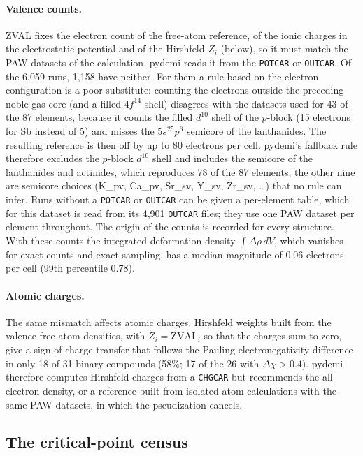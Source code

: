 \documentclass[11pt,a4paper]{article}
\begin{document}
\paragraph{Valence counts.} ZVAL fixes the electron count of the free-atom
reference, of the ionic charges in the electrostatic potential and of the
Hirshfeld $Z_i$ (below), so it must match the PAW datasets of the calculation.
pydemi reads it from the \texttt{POTCAR} or \texttt{OUTCAR}. Of the 6,059 runs,
1,158 have neither. For them a rule based on the electron configuration is a
poor substitute: counting the electrons outside the preceding noble-gas core
(and a filled $4f^{14}$ shell)
disagrees with the datasets used for 43 of the 87 elements, because it counts
the filled $d^{10}$ shell of the $p$-block (15 electrons for Sb instead of 5)
and misses the $5s^25p^6$ semicore of the lanthanides. The resulting reference
is then off by up to 80 electrons per cell. pydemi's fallback rule therefore
excludes the $p$-block $d^{10}$ shell and includes the semicore of the
lanthanides and actinides, which reproduces 78 of the 87 elements; the other
nine are semicore choices (K\_pv, Ca\_pv, Sr\_sv, Y\_sv, Zr\_sv, \ldots) that
no rule can infer. Runs without a \texttt{POTCAR} or \texttt{OUTCAR} can be
given a per-element table, which for this dataset is read from its 4,901
\texttt{OUTCAR} files; they use one PAW dataset per element throughout. The
origin of the counts is recorded for every structure. With these counts the
integrated deformation density $\int\Delta\rho\,dV$, which vanishes for exact
counts and exact sampling, has a median magnitude of 0.06 electrons per cell
(99th percentile 0.78).

\paragraph{Atomic charges.} The same mismatch affects atomic charges.
Hirshfeld weights built from the valence free-atom densities, with
$Z_i=\mathrm{ZVAL}_i$ so that the charges sum to zero, give a sign of charge
transfer that follows the Pauling electronegativity difference in only 18 of
31 binary compounds (58\%; 17 of the 26 with $\Delta\chi>0.4$). pydemi
therefore computes Hirshfeld charges from a \texttt{CHGCAR} but recommends the
all-electron density, or a reference built from isolated-atom calculations
with the same PAW datasets, in which the pseudization cancels.

\subsection{The critical-point census}
\label{sec:numerics:census}
\end{document}
